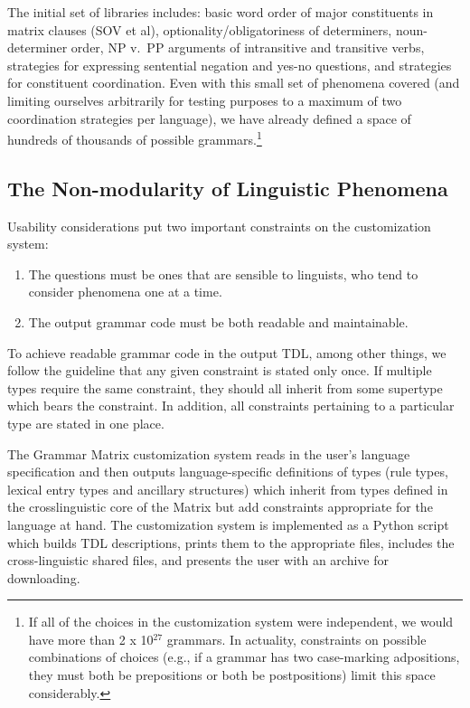 \documentclass[11pt]{article}
\begin{document}
The initial set of libraries includes: basic word order of major
constituents in matrix clauses (SOV et al), optionality/obligatoriness
of determiners, noun-determiner order, NP v.\ PP arguments of
intransitive and transitive verbs, strategies for expressing
sentential negation and yes-no questions, and strategies for
constituent coordination.  Even with this small set of phenomena
covered (and limiting ourselves arbitrarily for testing purposes to a
maximum of two coordination strategies per language), we have already
defined a space of hundreds of thousands of possible
grammars.\footnote{If all of the choices in the customization system
were independent, we would have more than 2 x 10$^{27}$ grammars.  In
actuality, constraints on possible combinations of choices (e.g., if a
grammar has two case-marking adpositions, they must both be
prepositions or both be postpositions) limit this space considerably.}

\subsection{The Non-modularity of Linguistic Phenomena}

Usability
considerations put two important constraints on the customization
system: 

\begin{enumerate}
\item The questions must be ones that are sensible to linguists,
who tend to consider phenomena one at a time.  
\item The output grammar code must be both readable and maintainable.
\end{enumerate}
%
To achieve readable grammar code in the output TDL, among other
things, we follow the guideline that any given constraint is
stated only once.  If multiple types require the same constraint, they
should all inherit from some supertype which bears the constraint.
In addition, all constraints pertaining to a particular type are
stated in one place.

The Grammar Matrix customization system reads in the user's language
specification and then outputs language-specific definitions of types
(rule types, lexical entry types and ancillary structures) which
inherit from types defined in the crosslinguistic core of the Matrix
but add constraints appropriate for the language at hand. The customization
system is implemented as a Python script which builds TDL descriptions,
prints them to the appropriate files, includes the cross-linguistic
shared files, and presents the user with an archive for downloading.
\end{document}

